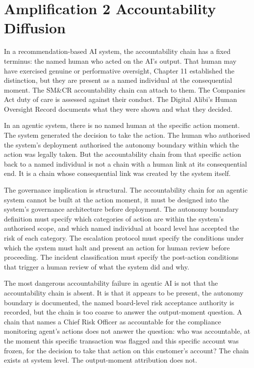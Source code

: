 \section{Amplification 2 Accountability Diffusion}

In a recommendation-based AI system, the accountability chain has a fixed terminus: the named human who acted on the AI's output. That human may have exercised genuine or performative oversight, Chapter 11 established the distinction, but they are present as a named individual at the consequential moment. The SM\&CR accountability chain can attach to them. The Companies Act duty of care is assessed against their conduct. The Digital Alibi's Human Oversight Record documents what they were shown and what they decided.

In an agentic system, there is no named human at the specific action moment. The system generated the decision to take the action. The human who authorised the system's deployment authorised the autonomy boundary within which the action was legally taken. But the accountability chain from that specific action back to a named individual is not a chain with a human link at its consequential end. It is a chain whose consequential link was created by the system itself.

The governance implication is structural. The accountability chain for an agentic system cannot be built at the action moment, it must be designed into the system's governance architecture before deployment. The autonomy boundary definition must specify which categories of action are within the system's authorised scope, and which named individual at board level has accepted the risk of each category. The escalation protocol must specify the conditions under which the system must halt and present an action for human review before proceeding. The incident classification must specify the post-action conditions that trigger a human review of what the system did and why.

The most dangerous accountability failure in agentic AI is not that the accountability chain is absent. It is that it appears to be present, the autonomy boundary is documented, the named board-level risk acceptance authority is recorded, but the chain is too coarse to answer the output-moment question. A chain that names a Chief Risk Officer as accountable for the compliance monitoring agent's actions does not answer the question: who was accountable, at the moment this specific transaction was flagged and this specific account was frozen, for the decision to take that action on this customer's account? The chain exists at system level. The output-moment attribution does not.

